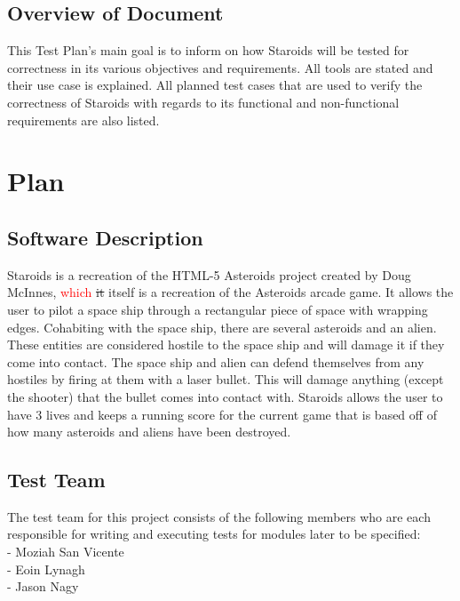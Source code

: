 \documentclass[12pt, titlepage]{article}
\begin{document}
\subsection{Overview of Document}
This Test Plan's main goal is to inform on how Staroids will be tested for correctness in its various objectives and requirements. All tools are stated and their use case is explained. All planned test cases that are used to verify the correctness of Staroids with regards to its functional and non-functional requirements are also listed.

\section{Plan}

\subsection{Software Description}
Staroids is a recreation of the HTML-5 Asteroids project created by Doug McInnes, \textcolor{red}{which} \sout{it} itself is a recreation of the Asteroids arcade game. It allows the user to pilot a space ship through a rectangular piece of space with wrapping edges. Cohabiting with the space ship, there are several asteroids and an alien. These entities are considered hostile to the space ship and will damage it if they come into contact. The space ship and alien can defend themselves from any hostiles by firing at them with a laser bullet. This will damage anything (except the shooter) that the bullet comes into contact with. Staroids allows the user to have 3 lives and keeps a running score for the current game that is based off of how many asteroids and aliens have been destroyed.

\subsection{Test Team}
The test team for this project consists of the following members who are each responsible for writing and executing tests for modules later to be specified:\\
- Moziah San Vicente\\
- Eoin Lynagh\\
- Jason Nagy\\
\end{document}
